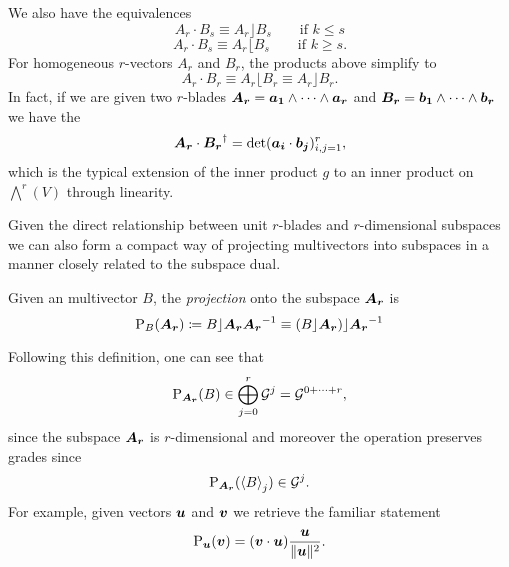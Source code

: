 We also have the equivalences
\begin{equation}
\label{eq:left_contraction_dot}
A_r \cdot B_s \equiv A_r \rfloor B_s \qquad \textrm{if $k\leq s$}
\end{equation}
\begin{equation}
\label{eq:right_contraction_dot}
A_r \cdot B_s \equiv A_r \lfloor B_s \qquad \textrm{if $k\geq s$}.
\end{equation}
For homogeneous $r$-vectors $A_r$ and $B_r$, the products above simplify to 
\begin{equation}
\label{dot_equivalent_contraction}
    A_r \cdot B_r \equiv A_r \lfloor B_r \equiv A_r \rfloor B_r.
\end{equation}
In fact, if we are given two $r$-blades $\blade{A_r} = \blade{a_1} \wedge \cdots \wedge \blade{a_r}$ and $\blade{B_r} = \blade{b_1} \wedge \cdots \wedge \blade{b_r}$ we have the 
\begin{equation}
\label{eq:dot_product}
\blade{A_r} \cdot \blade{B_r}^\dagger = \det(\blade{a_i} \cdot \blade{b_j} )_{i,j=1}^r,
\end{equation}
which is the typical extension of the inner product $g$ to an inner product on $\bigwedge^r (V)$ through linearity.

Given the direct relationship between unit $r$-blades and $r$-dimensional subspaces we can also form a compact way of projecting multivectors into subspaces in a manner closely related to the subspace dual.  \begin{definition}
Given an multivector $B$, the \emph{projection} onto the subspace $\blade{A_r}$ is
\begin{equation}
\label{eq:projection}
\projection_{B}(\blade{A_r}) \coloneqq B\rfloor \blade{A_r} \blade{A_r}^{-1} \equiv (B\rfloor \blade{A_r})\rfloor \blade{A_r}^{-1}
\end{equation}
\end{definition}
Following this definition, one can see that
\begin{equation}
\projection_{\blade{A_r}}(B) \in \bigoplus_{j=0}^r \G^j = \G^{0+\cdots + r},
\end{equation}
since the subspace $\blade{A_r}$ is $r$-dimensional and moreover the operation preserves grades since
\begin{equation}
\projection_{\blade{A_r}}(\proj{j}{B}) \in \G^j.
\end{equation}
For example, given vectors $\blade{u}$ and $\blade{v}$ we retrieve the familiar statement 
\begin{equation}
\projection_{\blade{u}} (\blade{v}) = (\blade{v} \cdot \blade{u}) \frac{\blade{u}}{\|\blade{u}\|^2}.
\end{equation}

